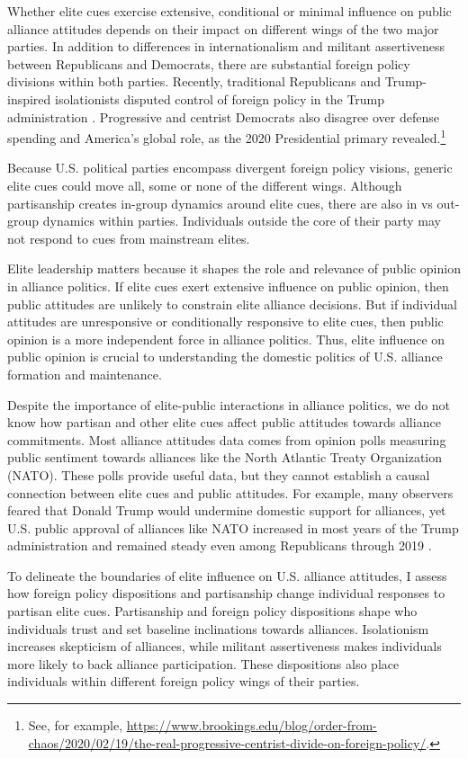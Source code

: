 \documentclass[12pt]{article}
\begin{document}
Whether elite cues exercise extensive, conditional or minimal influence on public alliance attitudes depends on their impact on different wings of the two major parties. 
In addition to differences in internationalism and militant assertiveness between Republicans and Democrats, there are substantial foreign policy divisions within both parties.
Recently, traditional Republicans and Trump-inspired isolationists disputed control of foreign policy in the Trump administration \citep{Dueck2019}.
Progressive and centrist Democrats also disagree over defense spending and America's global role, as the 2020 Presidential primary revealed.\footnote{See, for example, \url{https://www.brookings.edu/blog/order-from-chaos/2020/02/19/the-real-progressive-centrist-divide-on-foreign-policy/}.} 


Because U.S. political parties encompass divergent foreign policy visions, generic elite cues could move all, some or none of the different wings.
Although partisanship creates in-group dynamics around elite cues, there are also in vs out-group dynamics within parties. 
Individuals outside the core of their party may not respond to cues from mainstream elites.


Elite leadership matters because it shapes the role and relevance of public opinion in alliance politics.
If elite cues exert extensive influence on public opinion, then public attitudes are unlikely to constrain elite alliance decisions.
But if individual attitudes are unresponsive or conditionally responsive to elite cues, then public opinion is a more independent force in alliance politics. 
Thus, elite influence on public opinion is crucial to understanding the domestic politics of U.S. alliance formation and maintenance.  


Despite the importance of elite-public interactions in alliance politics, we do not know how partisan and other elite cues affect public attitudes towards alliance commitments. 
Most alliance attitudes data comes from opinion polls measuring public sentiment towards alliances like the North Atlantic Treaty Organization (NATO).
These polls provide useful data, but they cannot establish a causal connection between elite cues and public attitudes.
For example, many observers feared that Donald Trump would undermine domestic support for alliances, yet U.S. public approval of alliances like NATO increased in most years of the Trump administration and remained steady even among Republicans through 2019 \citep{PewNATO2020}.


To delineate the boundaries of elite influence on U.S. alliance attitudes, I assess how foreign policy dispositions and partisanship change individual responses to partisan elite cues.
Partisanship and foreign policy dispositions shape who individuals trust and set baseline inclinations towards alliances. 
Isolationism increases skepticism of alliances, while militant assertiveness makes individuals more likely to back alliance participation. 
These dispositions also place individuals within different foreign policy wings of their parties. 
\end{document}
